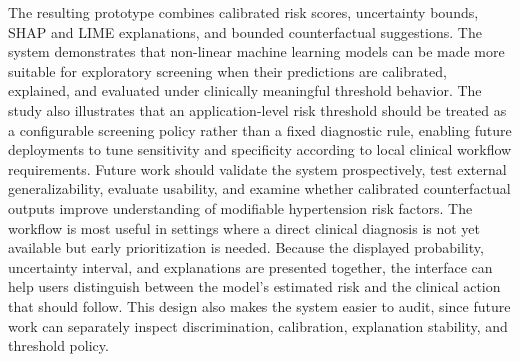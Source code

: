 \documentclass[journal]{IEEEtran}
\begin{document}
The resulting prototype combines calibrated risk scores, uncertainty bounds, SHAP and LIME explanations, and bounded counterfactual suggestions. The system demonstrates that non-linear machine learning models can be made more suitable for exploratory screening when their predictions are calibrated, explained, and evaluated under clinically meaningful threshold behavior. The study also illustrates that an application-level risk threshold should be treated as a configurable screening policy rather than a fixed diagnostic rule, enabling future deployments to tune sensitivity and specificity according to local clinical workflow requirements. Future work should validate the system prospectively, test external generalizability, evaluate usability, and examine whether calibrated counterfactual outputs improve understanding of modifiable hypertension risk factors. The workflow is most useful in settings where a direct clinical diagnosis is not yet available but early prioritization is needed. Because the displayed probability, uncertainty interval, and explanations are presented together, the interface can help users distinguish between the model's estimated risk and the clinical action that should follow. This design also makes the system easier to audit, since future work can separately inspect discrimination, calibration, explanation stability, and threshold policy.

\balance

\end{document}
